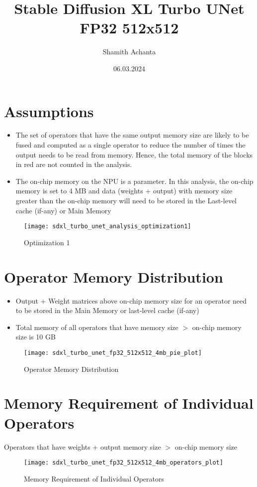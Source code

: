 \documentclass[12pt, legalpaper, landscape]{article}
\begin{document}
\title{Stable Diffusion XL Turbo UNet FP32 512x512}
\author{Shamith Achanta}
\date{06.03.2024}

\maketitle

\section{Assumptions}
\begin{itemize}
	\item The set of operators that have the same output memory size are likely to be fused and computed as a single operator to reduce the number of times the output needs to be read from memory. Hence, the total memory of the blocks in red are not counted in the analysis.
	\item The on-chip memory on the NPU is a parameter. In this analysis, the on-chip memory is set to 4 MB and data (weights + output) with memory size greater than the on-chip memory will need to be stored in the Last-level cache (if-any) or Main Memory
\end{itemize}

\begin{figure}[h]
\caption{Optimization 1}
\centering
\texttt{[image: sdxl\_turbo\_unet\_analysis\_optimization1]}
\end{figure}

\clearpage

\section{Operator Memory Distribution}
\begin{itemize}
	\item Output + Weight matrices above on-chip memory size for an operator need to be stored in the Main Memory or last-level cache (if-any)
	\item Total memory of all operators that have memory size $>$ on-chip memory size is 10 GB
\end{itemize}

\begin{figure}[h]
\caption{Operator Memory Distribution}
\centering
\texttt{[image: sdxl\_turbo\_unet\_fp32\_512x512\_4mb\_pie\_plot]}
\end{figure}

\clearpage

\section{Memory Requirement of Individual Operators}
Operators that have weights + output memory size $>$ on-chip memory size

\begin{figure}[h]
\caption{Memory Requirement of Individual Operators}
\centering
\texttt{[image: sdxl\_turbo\_unet\_fp32\_512x512\_4mb\_operators\_plot]}
\end{figure}

\clearpage
\end{document}

